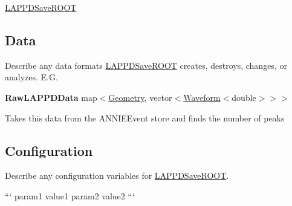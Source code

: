 \hyperlink{classLAPPDSaveROOT}{L\-A\-P\-P\-D\-Save\-R\-O\-O\-T}

\subsection*{Data}

Describe any data formats \hyperlink{classLAPPDSaveROOT}{L\-A\-P\-P\-D\-Save\-R\-O\-O\-T} creates, destroys, changes, or analyzes. E.\-G.

{\bfseries Raw\-L\-A\-P\-P\-D\-Data} {\ttfamily map$<$\hyperlink{classGeometry}{Geometry}, vector$<$\hyperlink{classWaveform}{Waveform}$<$double$>$$>$$>$}
\begin{DoxyItemize}
\item Takes this data from the {\ttfamily A\-N\-N\-I\-E\-Event} store and finds the number of peaks
\end{DoxyItemize}

\subsection*{Configuration}

Describe any configuration variables for \hyperlink{classLAPPDSaveROOT}{L\-A\-P\-P\-D\-Save\-R\-O\-O\-T}.

``` param1 value1 param2 value2 ``` 